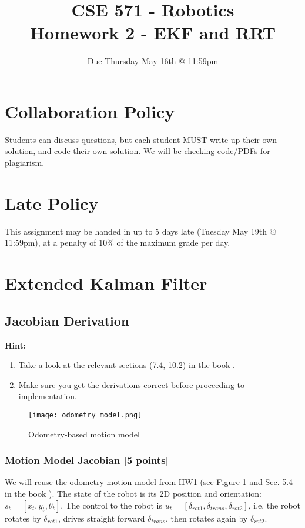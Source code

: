 \documentclass{article}
\title{CSE 571 - Robotics \\ Homework 2 - EKF and RRT}
\author{Due Thursday May 16th @ 11:59pm}
\date{}
\begin{document}
\maketitle

\section*{Collaboration Policy}
Students can discuss questions, but each student MUST write up their own solution, and code their own solution. We will be checking code/PDFs for plagiarism.

\section*{Late Policy}
This assignment may be handed in up to 5 days late (Tuesday May 19th @ 11:59pm), at a penalty of 10\% of the maximum grade per day.

\section{Extended Kalman Filter}

\subsection{Jacobian Derivation}

\textbf{Hint:}
\begin{enumerate}
    \item Take a look at the relevant sections (7.4, 10.2) in the book \cite{thrun2005probabilistic}.
    \item Make sure you get the derivations correct before proceeding to implementation.
\end{enumerate}

\begin{figure}[h]
    \centering
    \texttt{[image: odometry\_model.png]}
    \caption{Odometry-based motion model}
    \label{fig:odometry}
\end{figure}

\subsubsection{Motion Model Jacobian [5 points]}
We will reuse the odometry motion model from HW1 (see Figure \ref{fig:odometry} and Sec. 5.4 in the book \cite{thrun2005probabilistic}). The state of the robot is its 2D position and orientation: $s_{t}=[x_{t},y_{t},\theta_{t}]$. The control to the robot is $u_{t}=[\delta_{rot1},\delta_{trans},\delta_{rot2}]$, i.e. the robot rotates by $\delta_{rot1}$, drives straight forward $\delta_{trans}$, then rotates again by $\delta_{rot2}$.
\end{document}
